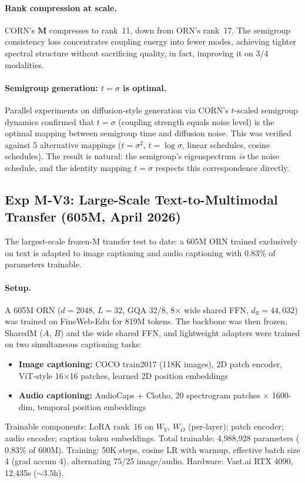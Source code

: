 \documentclass[11pt, a4paper]{article}
\newcommand{\M}{\mathbf{M}}
\theoremstyle{plain}
\theoremstyle{remark}
\begin{document}
\paragraph{Rank compression at scale.}
CORN's $\M$ compresses to rank~11, down from ORN's rank~17.
The semigroup consistency loss concentrates coupling energy into fewer modes, achieving tighter spectral structure without sacrificing quality, in fact, improving it on 3/4 modalities.

\paragraph{Semigroup generation: $t = \sigma$ is optimal.}
Parallel experiments on diffusion-style generation via CORN's $t$-scaled semigroup dynamics confirmed that $t = \sigma$ (coupling strength equals noise level) is the optimal mapping between semigroup time and diffusion noise.
This was verified against 5 alternative mappings ($t = \sigma^2$, $t = \log\sigma$, linear schedules, cosine schedules).
The result is natural: the semigroup's eigenspectrum \emph{is} the noise schedule, and the identity mapping $t = \sigma$ respects this correspondence directly.

\subsection{Exp M-V3: Large-Scale Text-to-Multimodal Transfer (605M, April 2026)}\label{sec:v3-transfer}

The largest-scale frozen-M transfer test to date: a 605M ORN trained exclusively on text is adapted to image captioning and audio captioning with $0.83\%$ of parameters trainable.

\paragraph{Setup.}
A 605M ORN ($d{=}2048$, $L{=}32$, GQA 32/8, 8$\times$ wide shared FFN, $d_{\text{ff}}{=}44{,}032$) was trained on FineWeb-Edu for 819M tokens.
The backbone was then frozen, SharedM ($A$, $B$) and the wide shared FFN, and lightweight adapters were trained on two simultaneous captioning tasks:
\begin{itemize}[nosep]
    \item \textbf{Image captioning:} COCO train2017 (118K images), 2D patch encoder, ViT-style 16$\times$16 patches, learned 2D position embeddings
    \item \textbf{Audio captioning:} AudioCaps + Clotho, 20 spectrogram patches $\times$ 1600-dim, temporal position embeddings
\end{itemize}
Trainable components: LoRA rank~16 on $W_V$, $W_O$ (per-layer); patch encoder; audio encoder; caption token embeddings.
Total trainable: 4,988,928 parameters ($0.83\%$ of 600M).
Training: 50K steps, cosine LR with warmup, effective batch size 4 (grad accum 4), alternating 75/25 image/audio.
Hardware: Vast.ai RTX 4090, 12{,}435s (${\sim}3.5$h).
\end{document}
